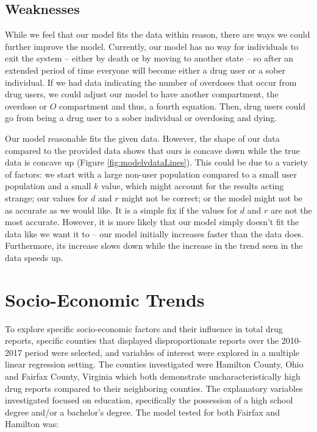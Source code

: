 \documentclass[12pt, letterpaper]{article}
\begin{document}
\subsection{Weaknesses}
While we feel that our model fits the data within reason, there are ways we could further improve the model. Currently, our model has no way for individuals to exit the system -- either by death or by moving to another state -- so after an extended period of time everyone will become either a drug user or a sober individual. If we had data indicating the number of overdoses that occur from drug users, we could adjust our model to have another compartment, the overdose or $O$ compartment and thus, a fourth equation. Then, drug users could go from being a drug user to a sober individual or overdosing and dying. 

Our model reasonable fits the given data. However, the shape of our data compared to the provided data shows that ours is concave down while the true data is concave up (Figure \ref{fig:modelvdataLines}). This could be due to a variety of factors: we start with a large non-user population compared to a small user population and a small $k$ value, which might account for the results acting strange; our values for $d$ and $r$ might not be correct; or the model might not be as accurate as we would like. It is a simple fix if the values for $d$ and $r$ are not the most accurate. However, it is more likely that our model simply doesn't fit the data like we want it to -- our model initially increases faster than the data does. Furthermore, its increase slows down while the increase in the trend seen in the data speeds up.

\section{Socio-Economic Trends}
To explore specific socio-economic factors and their influence in total drug reports, specific counties that displayed disproportionate reports over the 2010-2017 period were selected, and variables of interest were explored in a multiple linear regression setting. The counties investigated were Hamilton County, Ohio and Fairfax County, Virginia which both demonstrate uncharacteristically high drug reports compared to their neighboring counties. The explanatory variables investigated focused on education, specifically the possession of a high school degree and/or a bachelor's degree. The model tested for both Fairfax and Hamilton was: \\
\end{document}

